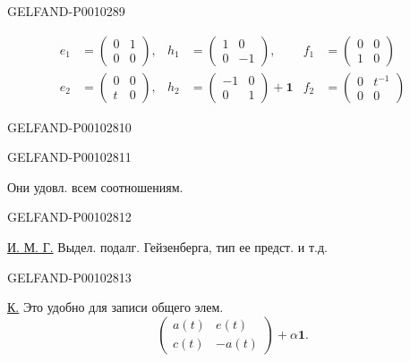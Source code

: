 \begin{GelfandAdjacentEvidence}{GELFAND-P001028}{9}

\begin{equation*}
\begin{aligned}
e_1&=\begin{pmatrix}0&1\\0&0\end{pmatrix},&
h_1&=\begin{pmatrix}1&0\\0&-1\end{pmatrix},&
f_1&=\begin{pmatrix}0&0\\1&0\end{pmatrix}\\
e_2&=\begin{pmatrix}0&0\\t&0\end{pmatrix},&
h_2&=\begin{pmatrix}-1&0\\0&1\end{pmatrix}+\mathbf1&
f_2&=\begin{pmatrix}0&t^{-1}\\0&0\end{pmatrix}
\end{aligned}
\tag{2}
\end{equation*}
\end{GelfandAdjacentEvidence}
\begin{GelfandAdjacentEvidence}{GELFAND-P001028}{10}

\end{GelfandAdjacentEvidence}
\begin{GelfandAdjacentEvidence}{GELFAND-P001028}{11}


Они удовл. всем соотношениям.
\end{GelfandAdjacentEvidence}
\begin{GelfandAdjacentEvidence}{GELFAND-P001028}{12}


\underline{И. М. Г.} Выдел. подалг. Гейзенберга, тип ее предст. и т.д.
\end{GelfandAdjacentEvidence}
\begin{GelfandAdjacentEvidence}{GELFAND-P001028}{13}


\underline{К.} Это удобно для записи общего элем.
\begin{equation*}
\begin{pmatrix}a(t)&e(t)\\c(t)&-a(t)\end{pmatrix}+\alpha\mathbf1.
\tag{3}
\end{equation*}
\end{GelfandAdjacentEvidence}



